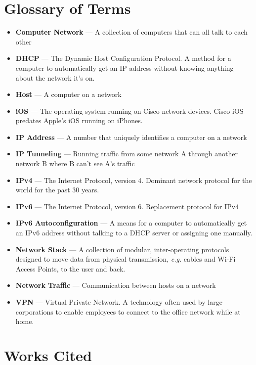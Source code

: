 \documentclass[12pt]{article}
\begin{document}
\section{Glossary of Terms}

\begin{itemize}
\item[] \textbf{Computer Network} --- A collection of computers that can all talk to each other
\item[] \textbf{DHCP} --- The Dynamic Host Configuration Protocol. A method for a computer to automatically get an IP address without knowing anything about the network it's on.
\item[] \textbf{Host} --- A computer on a network
\item[] \textbf{iOS} --- The operating system running on Cisco network devices. Cisco iOS predates Apple's iOS running on iPhones.
\item[] \textbf{IP Address} --- A number that uniquely identifies a computer on a network
\item[] \textbf{IP Tunneling} --- Running traffic from some network A  through another network B where B can't see A's traffic
\item[] \textbf{IPv4} --- The Internet Protocol, version 4. Dominant network protocol for the world for the past 30 years.
\item[] \textbf{IPv6} --- The Internet Protocol, version 6. Replacement protocol for IPv4
\item[] \textbf{IPv6 Autoconfiguration} --- A means for a computer to automatically get an IPv6 address without talking to a DHCP server or assigning one manually.
\item[] \textbf{Network Stack} --- A collection of modular, inter-operating protocols designed to move data from physical transmission, \textit{e.g.} cables and Wi-Fi Access Points, to the user and back.
\item[] \textbf{Network Traffic} --- Communication between hosts on a network
\item[] \textbf{VPN} --- Virtual Private Network. A technology often used by large corporations to enable employees to connect to the office network while at home.
\end{itemize}

\section{Works Cited}
\end{document}
